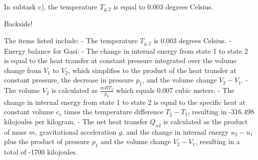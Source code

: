 In subtask c), the temperature \( T_{g,2} \) is equal to 0.003 degrees Celsius.

Backside!

The items listed include:
- The temperature \( T_{g,2} \) is 0.003 degrees Celsius.
- Energy balance for Gasi:
  - The change in internal energy from state 1 to state 2 is equal to the heat transfer at constant pressure integrated over the volume change from \( V_1 \) to \( V_2 \), which simplifies to the product of the heat transfer at constant pressure, the decrease in pressure \( p_1 \), and the volume change \( V_2 - V_1 \).
  - The volume \( V_2 \) is calculated as \( \frac{mRT_2}{p_2} \) which equals 0.007 cubic meters.
  - The change in internal energy from state 1 to state 2 is equal to the specific heat at constant volume \( c_v \) times the temperature difference \( T_2 - T_1 \), resulting in -316.498 kilojoules per kilogram.
  - The net heat transfer \( Q_{n2} \) is calculated as the product of mass \( m \), gravitational acceleration \( g \), and the change in internal energy \( u_2 - u_1 \) plus the product of pressure \( p_1 \) and the volume change \( V_2 - V_1 \), resulting in a total of -1700 kilojoules.